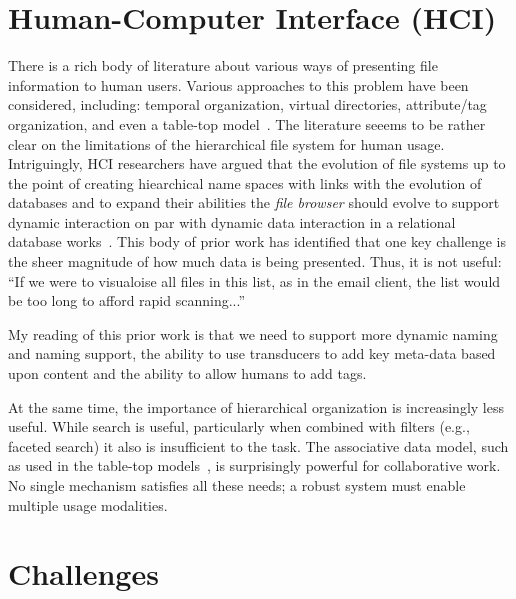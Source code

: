 
\section{Human-Computer Interface (HCI)}

There is a rich body of literature about various ways of presenting file
information to human users.  Various approaches to this problem have been
considered, including: temporal organization, virtual directories, attribute/tag
organization, and even a table-top model~\cite{collins2007tabletop}.  The
literature seeems to be rather clear on the limitations of the hierarchical file
system for human usage.  Intriguingly, HCI researchers have argued that the
evolution of file systems up to the point of creating hiearchical name spaces
with links with the evolution of databases and to expand their abilities the
\emph{file browser} should evolve to support dynamic interaction on par with
dynamic data interaction in a relational database
works~\cite{marsden2003improving}. This body of prior work has identified that
one key challenge is the sheer
magnitude of how much data is being presented.  Thus, it is not useful: ``If we
were to visualoise all files in this list, as in the email client, the list
would be too long to afford rapid scanning...''

My reading of this prior work is that we need to support more dynamic naming and
naming support, the ability to use transducers to add key meta-data based upon
content and the ability to allow humans to add tags.

At the same time, the importance of hierarchical organization is increasingly
less useful.  While search is useful, particularly when combined with filters
(e.g., faceted search) it also is insufficient to the task.  The associative
data model, such as used in the table-top models~\cite{collins2007tabletop}, is
surprisingly powerful for collaborative work.  No single mechanism satisfies all
these needs; a robust system must enable multiple usage modalities.

\section{Challenges}
\label{ch:background:sec:challenges}



